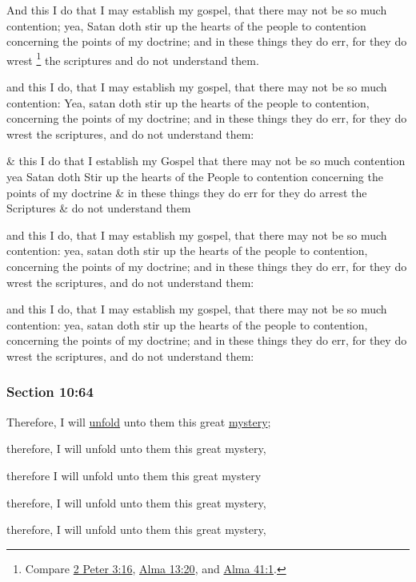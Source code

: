 		And this I do that I may establish my gospel, that there may not be so much contention; yea, Satan doth stir up the hearts of the people to contention concerning the points of my doctrine; and in these things they do err, for they do wrest%
			\footnote{%
				Compare \hyperref[2PETER-3-16]{2 Peter 3:16}, \hyperref[ALMA-13-20]{Alma 13:20}, and \hyperref[ALMA-41-1]{Alma 41:1}.
				}
		the scriptures and do not understand them.

		\begin{framed}
		\scriptsize
			\begin{compactdesc}
				\item[JSP] and this I do, that I may establish my gospel, that there may not be so much contention: Yea, satan doth stir up the hearts of the people to contention, concerning the points of my doctrine; and in these things they do err, for they do wrest the scriptures, and do not understand them:
				\item[RB1] \& this I do that I establish my Gospel that there may not be so much contention yea Satan doth Stir up the hearts of the People to contention concerning the points of my doctrine \& in these things they do err for they do arrest the Scriptures \& do not understand them
				\item[DC 1835] and this I do, that I may establish my gospel, that there may not be so much contention: yea, satan doth stir up the hearts of the people to contention, concerning the points of my doctrine; and in these things they do err, for they do wrest the scriptures, and do not understand them:
				\item[DC 1844] and this I do, that I may establish my gospel, that there may not be so much contention: yea, satan doth stir up the hearts of the people to contention, concerning the points of my doctrine; and in these things they do err, for they do wrest the scriptures, and do not understand them:
			\end{compactdesc}
		\end{framed}

	\subsubsection{Section 10:64} %
		\label{DC10-64}

		Therefore, I will \hyperref[UNFOLD]{unfold} unto them this great \hyperref[MYSTERY]{mystery};

		\begin{framed}
		\scriptsize
			\begin{compactdesc}
				\item[JSP] therefore, I will unfold unto them this great mystery,
				\item[RB1] therefore I will unfold unto them this great mystery
				\item[DC 1835] therefore, I will unfold unto them this great mystery,
				\item[DC 1844] therefore, I will unfold unto them this great mystery, 
			\end{compactdesc}
		\end{framed}

